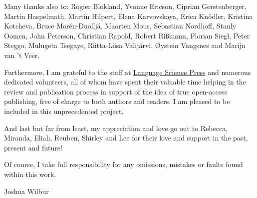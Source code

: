 \begin{sloppypar}
Many thanks also to:
Rogier Blokland, 
Yvonne Ericson, 
Ciprian Gerstenberger, 
Martin Haspelmath, 
Martin Hilpert, 
Elena Karvovskaya, 
Erica Knödler, 
Kristina Kotcheva, 
Bruce Morén-Duoll\-já, 
Maar\-ten Mous, 
Sebastian Nordhoff, 
Stanly Oomen, 
John Peterson, 
Christian Rapold, 
Robert Rißmann, 
Florian Siegl, 
Peter Steggo, 
Mulugeta Tsegaye, 
Riitta-Liisa Valijärvi, 
Øystein Vangs\-nes 
and 
Marijn van ’t Veer. 
\end{sloppypar}

Furthermore, I am grateful to the staff at \href{http://langsci-press.org/}{Language Science Press} and numerous dedicated volunteers, all of whom have spent their valuable time helping in the review and publication process in support of the idea of true open-access publishing, free of charge to both authors and readers. I am pleased to be included in this unprecedented project. 

And last but far from least, my appreciation and love go out to Rebecca, Miranda, Eliah, Reuben, Shirley and Lee for their love and support in the past, present and future!

Of course, I take full responsibility for any omissions, mistakes or faults found within this work. 

\hfill Joshua Wilbur

\hfill {}










%
